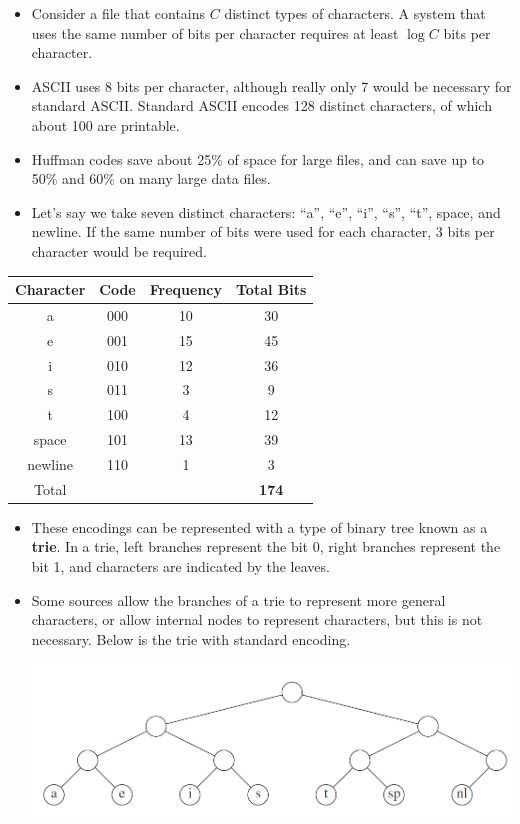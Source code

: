 \documentclass{article}
\begin{document}
\begin{itemize}
\begin{itemize}
        \item Consider a file that contains \(C\) distinct types of characters. A system that uses the same number of bits per character requires at least \(\log C\) bits per character.
        \item ASCII uses 8 bits per character, although really only 7 would be necessary for standard ASCII. Standard ASCII encodes 128 distinct characters, of which about 100 are printable.
        \item Huffman codes save about 25\% of space for large files, and can save up to 50\% and 60\% on many large data files.
        \item Let's say we take seven distinct characters: ``a'', ``e'', ``i'', ``s'', ``t'', space, and newline. If the same number of bits were used for each character, 3 bits per character would be required.
    \end{itemize}
    \begin{center}
    \begin{tabular}{|c c c c|}
    \hline
    Character & Code & Frequency & Total Bits \\ [0.5ex]
    \hline\hline
    a & 000 & 10 & 30 \\
    e & 001 & 15 & 45 \\
    i & 010 & 12 & 36 \\
    s & 011 & 3 & 9 \\
    t & 100 & 4 & 12 \\
    space & 101 & 13 & 39 \\
    newline & 110 & 1 & 3 \\
    Total & & & \textbf{174} \\
    \hline
    \end{tabular}
    \end{center}
    \begin{itemize}
        \item These encodings can be represented with a type of binary tree known as a \textbf{trie}. In a trie, left branches represent the bit 0, right branches represent the bit 1, and characters are indicated by the leaves.
        \item Some sources allow the branches of a trie to represent more general characters, or allow internal nodes to represent characters, but this is not necessary. Below is the trie with standard encoding.
        \begin{center}
        \includegraphics[scale=0.5]{trie1}

\end{center}
\end{itemize}
\end{itemize}
\end{document}
